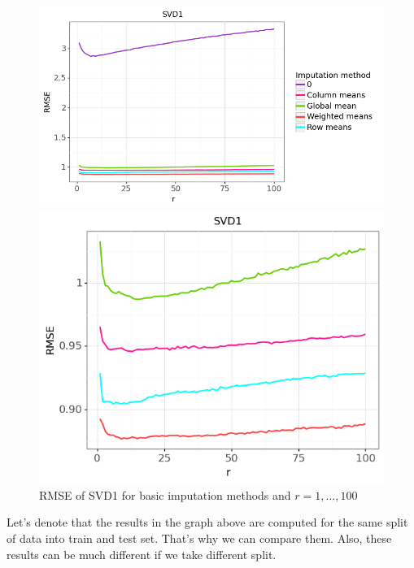 \documentclass[11pt]{amsart}
\begin{document}
\begin{figure}[H]
\centering
\begin{minipage}{.63\textwidth}
  \centering
  \includegraphics[width=\textwidth]{svd1_1}
\end{minipage}%
\begin{minipage}{.4\textwidth}
  \centering
  \includegraphics[width=\textwidth]{svd1_2}
\end{minipage}
\caption{RMSE of SVD1 for basic imputation methods and $r = 1, \dots, 100$}
\end{figure}

Let's denote that the results in the graph above are computed for the same split of data into train and test set.
That's why we can compare them.
Also, these results can be much different if we take different split.
\end{document}
